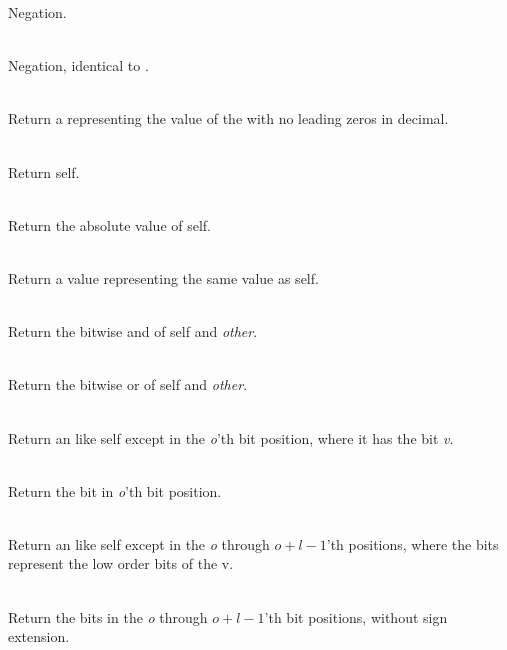 \begin{desc}
    Negation.
  \item[\kw{function} \opd{$-$} \returns{} \/\LB{}\tn{Integer}\/\RB{}]~\\
    Negation, identical to {\tt\mytilde}.
  \item[\kw{function} asString \returns{} \/\LB{}\tn{String}\/\RB{}]~\\
    Return a  representing the value of the  with no
    leading zeros in decimal.
  \item[\kw{function} hash \returns{} \/\LB{}\tn{Integer}\/\RB{}]~\\
    Return self.
  \item[\kw{function} abs \returns{} \/\LB{}\tn{Integer}\/\RB{}]~\\
    Return the absolute value of self.
  \item[\kw{function} asReal \returns{} \/\LB{}\tn{Real}\/\RB{}]~\\
    Return a  value representing the same value as self.
  \item[\kw{function} \opd{$\&$} \/\LB{}other \CO{} \tn{Integer}\/\RB{} \returns{} \/\LB{}\tn{Integer}\/\RB{}]~\\
    Return the bitwise and of self and {\it other}.
  \item[\kw{function} \opd{$|$} \/\LB{}other \CO{} \tn{Integer}\/\RB{} \returns{} \/\LB{}\tn{Integer}\/\RB{}]~\\
    Return the bitwise or of self and {\it other}.
  \item[\kw{function} setBit\/\LB{}o \CO{} \tn{Integer}, v \CO{} \tn{Boolean}\/\RB{} \returns{} \/\LB{}r \CO{} \tn{Integer}\/\RB{}]~\\
    Return an  like self except in the {\it o}'th bit position, 
    where it has the bit {\it v}.  
  \item[\kw{function} getBit\/\LB{}o \CO{} \tn{Integer}\/\RB{} \returns{} \/\LB{}r \CO{} \tn{Boolean}\/\RB{}]~\\
    Return the bit in {\it o}'th bit position.
  \item[\kw{function} setBits\/\LB{}o \CO{} \tn{Integer}, l \CO{} \tn{Integer}, v \CO{} \tn{Integer}\/\RB{} \returns{} \/\LB{}r \CO{} \tn{Integer}\/\RB{}]~\\
    Return an  like self except in the {\it o} through $o+l-1$'th positions, where
    the bits represent the low order bits of the  v.
  \item[\kw{function} getBits\/\LB{}o \CO{} \tn{Integer}, l \CO{} \tn{Integer}\/\RB{} \returns{} \/\LB{}r \CO{} \tn{Integer}\/\RB{}]~\\
    Return the bits in the {\it o} through $o+l-1$'th bit positions, without
    sign extension.
\end{desc}

